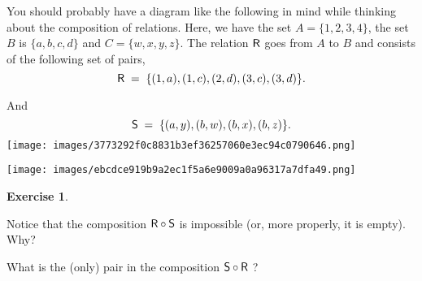 \documentclass[10pt,]{book}
\theoremstyle{plain}
\theoremstyle{definition}
\theoremstyle{definition}
\newtheorem{exercise}[theorem]{Exercise}
\numberwithin{equation}{section}
\newcommand{\relR}{\mbox{\textsf R}}
\newcommand{\relS}{\mbox{\textsf S}}
\begin{document}
    You should probably have a diagram like the following in mind while thinking
    about the composition of relations. Here, we have the set \(A=\{1,2,3,4\}\),
    the set \(B\) is \(\{a,b,c,d\}\) and \(C=\{w,x,y,z\}\). The relation
    \(\relR\) goes from \(A\) to \(B\) and consists of the following set of pairs,
    \begin{equation*}
      \relR \; = \; \{(1,a), (1,c), (2,d), (3,c), (3,d) \}.
    \end{equation*}
\par

    And
    \begin{equation*}
      \relS \; = \; \{(a,y), (b,w), (b,x), (b,z) \}.
    \end{equation*}
\texttt{[image: images/3773292f0c8831b3ef36257060e3ec94c0790646.png]}
\par

    \ifx\SetFigFont\undefined\gdef\SetFigFont#1#2#3#4#5{
    \reset@font\fontsize{#1}{#2pt}
    \fontfamily{#3}\fontseries{#4}\fontshape{#5}
    \selectfont}\fi
\texttt{[image: images/ebcdce919b9a2ec1f5a6e9009a0a96317a7dfa49.png]}
\begin{exercise}\label{exercise-48}

        Notice that the composition \(\relR \circ \relS\) is impossible (or, more
        properly, it is empty). Why?
\par

        What is the (only) pair in the composition \(\relS \circ \relR\) ?
\end{exercise}
\typeout{************************************************}
\typeout{************************************************}
\end{document}
